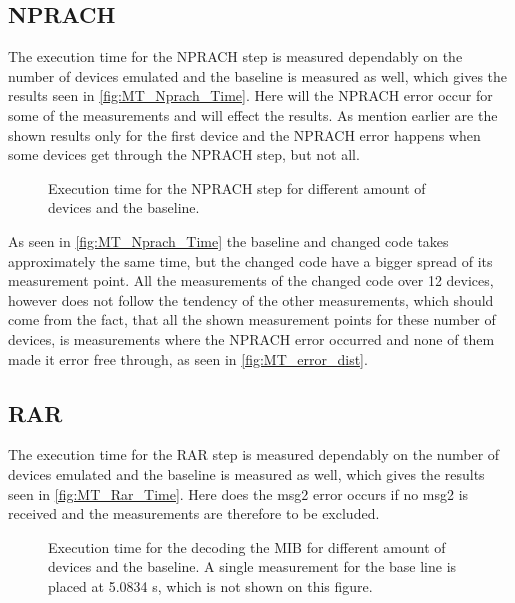 \subsection{NPRACH}
The execution time for the NPRACH step is measured dependably on the number of devices emulated and the baseline is measured as well, which gives the results seen in \autoref{fig:MT_Nprach_Time}. Here will the NPRACH error occur for some of the measurements and will effect the results. As mention earlier are the shown results only for the first device and the NPRACH error happens when some devices get through the NPRACH step, but not all.

\begin{figure}[H]
\centering
\resizebox{0.5\textwidth}{!}{
}
\caption{Execution time for the NPRACH step for different amount of devices and the baseline.}
\label{fig:MT_Nprach_Time}
\end{figure}

As seen in \autoref{fig:MT_Nprach_Time} the baseline and changed code takes approximately the same time, but the changed code have a bigger spread of its measurement point. All the measurements of the changed code over 12 devices, however does not follow the tendency of the other measurements, which should come from the fact, that all the shown measurement points for these number of devices, is measurements where the NPRACH error occurred and none of them made it error free through, as seen in \autoref{fig:MT_error_dist}.

\subsection{RAR}
The execution time for the RAR step is measured dependably on the number of devices emulated and the baseline is measured as well, which gives the results seen in \autoref{fig:MT_Rar_Time}. Here does the msg2 error occurs if no msg2 is received and the measurements are therefore to be excluded.

\begin{figure}[H]
\centering
\resizebox{0.5\textwidth}{!}{
}
\caption{Execution time for the decoding the MIB for different amount of devices and the baseline. A single measurement for the base line is placed at 5.0834 s, which is not shown on this figure.}
\label{fig:MT_Rar_Time}
\end{figure}

